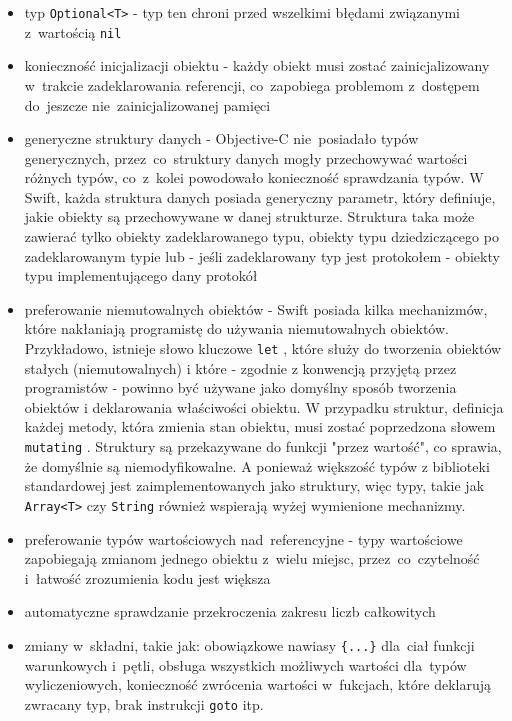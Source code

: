 \documentclass[mgr, shortabstract]{iithesis}
\newcommand{\swiftinline}[1]{
    \texttt{#1}
}
\begin{document}
\begin{itemize}
    \item typ \texttt{Optional<T>} - typ ten chroni przed wszelkimi błędami związanymi z~wartością \texttt{nil}
    \item konieczność inicjalizacji obiektu - każdy obiekt musi zostać zainicjalizowany w~trakcie zadeklarowania referencji, co~zapobiega problemom z~dostępem do~jeszcze nie~zainicjalizowanej pamięci
    \item generyczne struktury danych - Objective-C nie~posiadało typów generycznych, przez~co~struktury danych mogły przechowywać wartości różnych typów, co~z~kolei powodowało konieczność sprawdzania typów. W Swift, każda struktura danych posiada generyczny parametr, który definiuje, jakie obiekty są przechowywane w danej strukturze. Struktura taka może zawierać tylko obiekty zadeklarowanego typu, obiekty typu dziedziczącego po zadeklarowanym typie lub - jeśli zadeklarowany typ jest protokołem - obiekty typu implementującego dany protokół
    \item preferowanie niemutowalnych obiektów - Swift posiada kilka mechanizmów, które nakłaniają programistę do używania niemutowalnych obiektów. Przykładowo, istnieje słowo kluczowe \swiftinline{let}, które służy do tworzenia obiektów stałych (niemutowalnych) i które - zgodnie z konwencją przyjętą przez programistów - powinno być używane jako domyślny sposób tworzenia obiektów i deklarowania właściwości obiektu. W przypadku struktur, definicja każdej metody, która zmienia stan obiektu, musi zostać poprzedzona słowem \swiftinline{mutating}. Struktury są przekazywane do funkcji "przez wartość", co sprawia, że domyślnie są niemodyfikowalne. A ponieważ większość typów z biblioteki standardowej jest zaimplementowanych jako struktury, więc typy, takie jak \swiftinline{Array<T>} czy \swiftinline{String} również wspierają wyżej wymienione mechanizmy.
    \item preferowanie typów wartościowych nad~referencyjne - typy wartościowe zapobiegają zmianom jednego obiektu z~wielu miejsc, przez~co~czytelność i~łatwość zrozumienia kodu jest większa
    \item automatyczne sprawdzanie przekroczenia zakresu liczb całkowitych
    \item zmiany w~składni, takie jak: obowiązkowe nawiasy \texttt{\{...\}} dla~ciał funkcji warunkowych i~pętli, obsługa wszystkich możliwych wartości dla~typów wyliczeniowych, konieczność zwrócenia wartości w~fukcjach, które deklarują zwracany typ, brak instrukcji \texttt{goto} itp.
\end{itemize}
\end{document}
